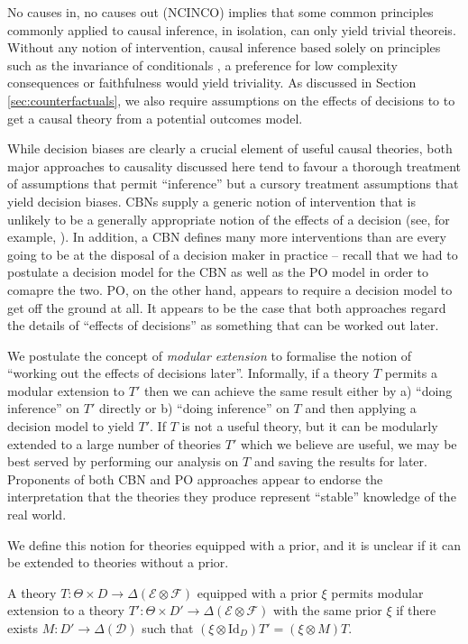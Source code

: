 No causes in, no causes out (NCINCO) implies that some common principles commonly applied to causal inference, in isolation, can only yield trivial theoreis. Without any notion of intervention, causal inference based solely on principles such as the invariance of conditionals \citet{arjovsky_invariant_2019,peters_causal_2016}, a preference for low complexity consequences \citet{lemeire_replacing_2013} or faithfulness \citet{spirtes_causation_1993} would yield triviality. As discussed in Section \ref{sec:counterfactuals}, we also require assumptions on the effects of decisions to to get a causal theory from a potential outcomes model.

While decision biases are clearly a crucial element of useful causal theories, both major approaches to causality discussed here tend to favour a thorough treatment of assumptions that permit ``inference'' but a cursory treatment assumptions that yield decision biases. CBNs supply a generic notion of intervention that is unlikely to be a generally appropriate notion of the effects of a decision (see, for example, \cite{hernan_does_2008}). In addition, a CBN defines many more interventions than are every going to be at the disposal of a decision maker in practice -- recall that we had to postulate a decision model for the CBN as well as the PO model in order to comapre the two. PO, on the other hand, appears to require a decision model to get off the ground at all. It appears to be the case that both approaches regard the details of ``effects of decisions'' as something that can be worked out later.

We postulate the concept of \emph{modular extension} to formalise the notion of ``working out the effects of decisions later''. Informally, if a theory $T$ permits a modular extension to $T'$ then we can achieve the same result either by a) ``doing inference'' on $T'$ directly or b) ``doing inference'' on $T$ and then applying a decision model to yield $T'$. If $T$ is not a useful theory, but it can be modularly extended to a large number of theories $T'$ which we believe are useful, we may be best served by performing our analysis on $T$ and saving the results for later. Proponents of both CBN and PO approaches appear to endorse the interpretation that the theories they produce represent ``stable'' knowledge of the real world.

We define this notion for theories equipped with a prior, and it is unclear if it can be extended to theories without a prior.

\begin{definition}
A theory $T:\Theta\times D\to \Delta(\mathcal{E}\otimes\mathcal{F})$ equipped with a prior $\xi$ permits modular extension to a theory $T':\Theta\times D'\to \Delta(\mathcal{E}\otimes\mathcal{F})$ with the same prior $\xi$ if there exists $M:D'\to \Delta(\mathcal{D})$ such that $(\xi \otimes \mathrm{Id}_D) T'  = (\xi \otimes M) T$.
\end{definition}

